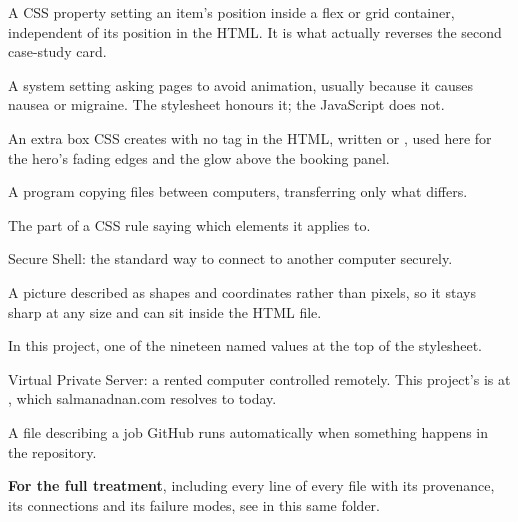 \documentclass[11pt,a4paper]{article}
\begin{document}
\begin{description}[leftmargin=0pt,style=nextline]
\item[order] A CSS property setting an item's position inside a flex or grid
  container, independent of its position in the HTML. It is what actually reverses
  the second case-study card.
\item[prefers-reduced-motion] A system setting asking pages to avoid animation,
  usually because it causes nausea or migraine. The stylesheet honours it; the
  JavaScript does not.
\item[Pseudo-element] An extra box CSS creates with no tag in the HTML, written
   or , used here for the hero's fading edges and the
  glow above the booking panel.
\item[rsync] A program copying files between computers, transferring only what
  differs.
\item[Selector] The part of a CSS rule saying which elements it applies to.
\item[SSH] Secure Shell: the standard way to connect to another computer securely.
\item[SVG] A picture described as shapes and coordinates rather than pixels, so it
  stays sharp at any size and can sit inside the HTML file.
\item[Token] In this project, one of the nineteen named values at the top of the
  stylesheet.
\item[VPS] Virtual Private Server: a rented computer controlled remotely. This
  project's is at , which salmanadnan.com resolves to today.
\item[Workflow] A file describing a job GitHub runs automatically when something
  happens in the repository.
\end{description}

\vspace{1em}
\noindent
\textbf{For the full treatment}, including every line of every file with its
provenance, its connections and its failure modes, see
 in this same folder.
\end{document}
